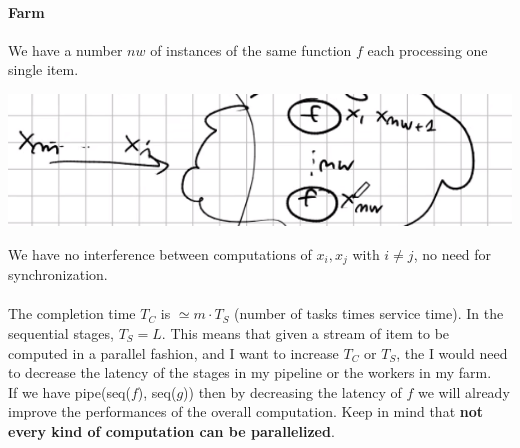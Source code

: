 \documentclass[10pt]{report}
\begin{document}
\paragraph{Farm}
We have a number $nw$ of instances of the same function $f$ each processing one single item.
\begin{center}
	\includegraphics[scale=0.5]{5.png}
\end{center}
We have no interference between computations of $x_i,x_j$ with $i\neq j$, no need for synchronization.\\\\
The completion time $T_C$ is $\simeq m\cdot T_S$ (number of tasks times service time). In the sequential stages, $T_S = L$. This means that given a stream of item to be computed in a parallel fashion, and I want to increase $T_C$ or $T_S$, the I would need to decrease the latency of the stages in my pipeline or the workers in my farm.\\
If we have pipe(seq($f$), seq($g$)) then by decreasing the latency of $f$ we will already improve the performances of the overall computation. Keep in mind that \textbf{not every kind of computation can be parallelized}.
\end{document}
